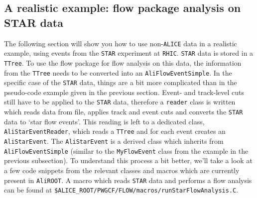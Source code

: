 \documentclass[a4paper]{book}
\numberwithin{equation}{subsection}
\begin{document}
\subsection{A realistic example: flow package analysis on STAR data}
The following section will show you how to use non-\texttt{ALICE} data in a realistic example, using events from the \texttt{STAR} experiment at \texttt{RHIC}. \texttt{STAR} data is stored in a \texttt{TTree}. To use the flow package for flow analysis on this data, the information from the \texttt{TTree} needs to be converted into an \texttt{AliFlowEventSimple}. In the specific case of the \texttt{STAR} data, things are a bit more complicated than in the pseudo-code example given in the previous section. Event- and track-level cuts still have to be applied to the \texttt{STAR} data, therefore a \texttt{reader} class is written which reads data from file, applies track and event cuts and converts the \texttt{STAR} data to `star flow events'. This reading is left to a dedicated class, \texttt{AliStarEventReader}, which reads a \texttt{TTree} and for each event creates an \texttt{AliStarEvent}. The \texttt{AliStarEvent} is a derived class which inherits from \texttt{AliFlowEventSimple} (similar to the \texttt{MyFlowEvent} class from the example in the previous subsection). To understand this process a bit better, we'll take a look at a few code snippets from the relevant classes and macros which are currently present in \texttt{AliROOT}. A macro which reads \texttt{STAR} data and performs a flow analysis can be found at \texttt{\$ALICE\_ROOT/PWGCF/FLOW/macros/runStarFlowAnalysis.C}.
\end{document}
